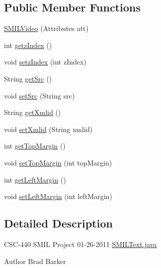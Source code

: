 \subsection*{Public Member Functions}
\begin{DoxyCompactItemize}
\item 
\hyperlink{classcsc440_1_1nuf_1_1components_1_1_s_m_i_l_video_ae035b34027fa1b5fbe193edda3a97099}{S\-M\-I\-L\-Video} (Attributes att)
\item 
int \hyperlink{classcsc440_1_1nuf_1_1components_1_1_s_m_i_l_video_aa3232eb51025bf28db9535a86612b009}{getz\-Index} ()
\item 
void \hyperlink{classcsc440_1_1nuf_1_1components_1_1_s_m_i_l_video_a8f92a71a8ee9b0a5d1790d37f79b03a5}{setz\-Index} (int z\-Index)
\item 
String \hyperlink{classcsc440_1_1nuf_1_1components_1_1_s_m_i_l_video_a5fade0f5c2c00847e55578ba7552f387}{get\-Src} ()
\item 
void \hyperlink{classcsc440_1_1nuf_1_1components_1_1_s_m_i_l_video_a71b325df14d62b9af9c041b4c3b545e7}{set\-Src} (String src)
\item 
String \hyperlink{classcsc440_1_1nuf_1_1components_1_1_s_m_i_l_video_a0377e2f5e8f3daa37bb89d1293998f2f}{get\-Xmlid} ()
\item 
void \hyperlink{classcsc440_1_1nuf_1_1components_1_1_s_m_i_l_video_a1fc9b627c59a98f05c88117d09866e83}{set\-Xmlid} (String xmlid)
\item 
int \hyperlink{classcsc440_1_1nuf_1_1components_1_1_s_m_i_l_video_a0c504798b02208fe24d6ab7f341aefea}{get\-Top\-Margin} ()
\item 
void \hyperlink{classcsc440_1_1nuf_1_1components_1_1_s_m_i_l_video_a00c196756cfc5e9763c19c29780ab62c}{set\-Top\-Margin} (int top\-Margin)
\item 
int \hyperlink{classcsc440_1_1nuf_1_1components_1_1_s_m_i_l_video_ae53a13869d3e765b692ec4dd4b828cc7}{get\-Left\-Margin} ()
\item 
void \hyperlink{classcsc440_1_1nuf_1_1components_1_1_s_m_i_l_video_a79264fb65053bb8afd1d04ebb3c56e02}{set\-Left\-Margin} (int left\-Margin)
\end{DoxyCompactItemize}


\subsection{Detailed Description}
C\-S\-C-\/440 S\-M\-I\-L Project 01-\/26-\/2011 \hyperlink{_s_m_i_l_text_8java}{S\-M\-I\-L\-Text.\-java} \begin{DoxyAuthor}{Author}
Brad Barker 
\end{DoxyAuthor}


